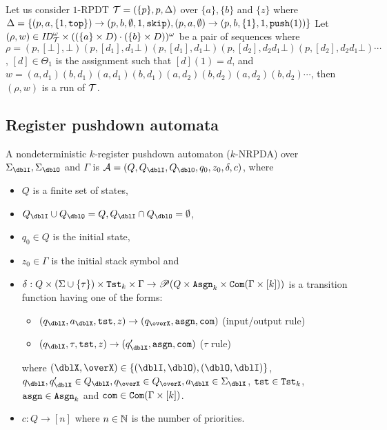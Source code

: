 \begin{example}
\label{ex: RPDT}
Let us consider $1$-RPDT
${\cal T} = (\{p\},p,\Delta)$
over $\{a\},\{b\}$ and $\{z\}$ where
$\Delta = \{
(p, a, \{1,\mathtt{top}\}) \rightarrow (p, b, \emptyset, 1, \mathtt{skip}),
(p, a, \emptyset) \rightarrow (p, b, \{1\}, 1, \mathtt{push}(1))
\}$
Let $(\rho,w)\in \mathit{ID}_{\cal T}^\omega\times ((\{a\}\times D)\cdot(\{b\}\times D))^\omega$
be a pair of sequences where
$\rho=(p,[\bot],\bot)(p,[d_1],d_1\bot)(p,[d_1],d_1\bot)(p,[d_2],d_2d_1\bot)(p,[d_2],d_2d_1\bot)\cdots$
, $[d]\in\Theta_1$ is the assignment such that $[d](1)=d$,
and
$w=(a,d_1)(b,d_1)(a,d_1)(b,d_1)(a,d_2)(b,d_2)(a,d_2)(b,d_2)\cdots$,
then $(\rho,w)$ is a run of ${\cal T}$.
\end{example}

\subsection{Register pushdown automata}\label{sec:RA}
\begin{definition}
A nondeterministic $k$-register pushdown automaton ($k$-NRPDA) over $\Sigma_\dblI,\Sigma_\dblO$ and $\Gamma$ is $\calA=(Q, Q_\dblI, Q_\dblO, q_0, z_0, \delta, c)$, where
\begin{itemize}
\item $Q$ is a finite set of states,
\item $Q_\dblI\cup Q_\dblO = Q, Q_\dblI\cap Q_\dblO = \emptyset$,
\item $q_0\in Q$ is the initial state, 
\item $z_0\in \Gamma$ is the initial stack symbol and
\item $\delta: Q \times (\Sigma\cup\{\tau\})\times \mathtt{Tst}_k\times\Gamma \to \mathscr{P}(Q \times\mathtt{Asgn}_k\times \mathtt{Com}(\Gamma\times[k]))$ is a transition function having one of the forms:
\begin{itemize}
\item $(q_\dblX,a_\dblX,\tst,z)\to(q_\overX,\asgn,\com)$ (input/output rule)
\item $(q_\dblX,\tau,\tst,z)\to(q'_\dblX,\asgn,\com)$ ($\tau$ rule)
\end{itemize}
where $(\dblX, \overX)\in\{(\dblI, \dblO), (\dblO,\dblI)\}$,
$q_\dblX, q'_\dblX\in Q_\dblX, q_\overX\in Q_\overX, a_\dblX\in \Sigma_\dblX$, $\mathtt{tst}\in\mathtt{Tst}_k$, $\mathtt{asgn}\in\mathtt{Asgn}_k$ and $\mathtt{com}\in\mathtt{Com}(\Gamma\times[k])$.
\item $c: Q \to [n]$ where $n\in \mathbb{N}$ is the number of priorities.
\end{itemize}
\end{definition}
